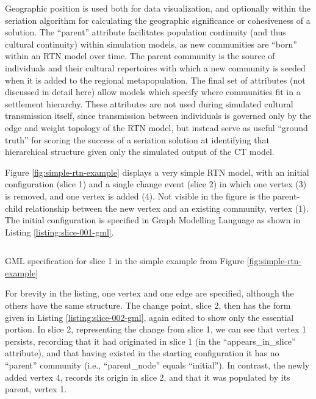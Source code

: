 Geographic position is used both for data visualization, and optionally within the \idss seriation algorithm for calculating the geographic significance or cohesiveness of a solution.  The ``parent'' attribute facilitates population continuity (and thus cultural continuity) within simulation models, as new communities are ``born'' within an RTN model over time.  The parent community is the source of individuals and their cultural repertoires with which a new community is seeded when it is added to the regional metapopulation.  The final set of attributes (not discussed in detail here) allow models which specify where communities fit in a settlement hierarchy.  These attributes are not used during simulated cultural transmission itself, since transmission between individuals is governed only by the edge and weight topology of the RTN model, but instead serve as useful ``ground truth'' for scoring the success of a seriation solution at identifying that hierarchical structure given only the simulated output of the CT model.  



Figure \ref{fig:simple-rtn-example} displays a very simple RTN model, with an initial configuration (slice 1) and a single change event (slice 2) in which one vertex (3) is removed, and one vertex is added (4).  Not visible in the figure is the parent-child relationship between the new vertex and an existing community, vertex (1).  The initial configuration is specified in Graph Modelling Language as shown in Listing \ref{listing:slice-001-gml}.

\begin{listing}[!h]
\inputminted{text}{objects/slice-001.gml.txt}
\caption{GML specification for slice 1 in the simple example from Figure \ref{fig:simple-rtn-example}}
\label{listing:slice-001-gml}
\end{listing}

For brevity in the listing, one vertex and one edge are specified, although the others have the same structure.  The change point, slice 2, then has the form given in Listing \ref{listing:slice-002-gml}, again edited to show only the essential portion.
In slice 2, representing the change from slice 1, we can see that vertex 1 persists, recording that it had originated in slice 1 (in the ``appears\_in\_slice'' attribute), and that having existed in the starting configuration it has no ``parent'' community (i.e., ``parent\_node'' equals ``initial'').  In contrast, the newly added vertex 4, records its origin in slice 2, and that it was populated by its parent, vertex 1.  

